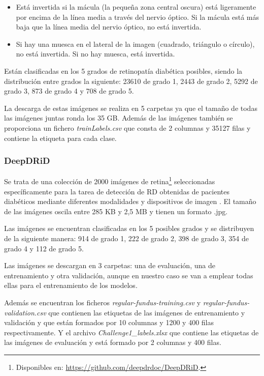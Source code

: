 \begin{itemize}
    \item Está invertida si la mácula (la pequeña zona central oscura) está ligeramente por encima de la línea media a través del nervio óptico. Si la mácula está más baja que la línea media del nervio óptico, no está invertida.
    \item Si hay una muesca en el lateral de la imagen (cuadrado, triángulo o círculo), no está invertida. Si no hay muesca, está invertida.
\end{itemize}

Están clasificadas en los 5 grados de retinopatía diabética posibles, siendo la distribución entre grados la siguiente: 23610 de grado 1, 2443 de grado 2, 5292 de grado 3, 873 de grado 4 y 708 de grado 5.

La descarga de estas imágenes se realiza en 5 carpetas ya que el tamaño de todas las imágenes juntas ronda los 35 GB. Además de las imágenes también se proporciona un fichero \textit{trainLabels.csv} que consta de 2 columnas y 35127 filas y contiene la etiqueta para cada clase.

\subsubsection{DeepDRiD}

Se trata de una colección de 2000 imágenes de retina\footnote{Disponibles en: \url{https://github.com/deepdrdoc/DeepDRiD}.} seleccionadas específicamente para la tarea de detección de RD obtenidas de pacientes diabéticos mediante diferentes modalidades y dispositivos de imagen \cite{datos:deepid}. El tamaño de las imágenes oscila entre 285 KB y 2,5 MB y tienen un formato .jpg.

Las imágenes se encuentran clasificadas en los 5 posibles grados y se distribuyen de la siguiente manera: 914 de grado 1, 222 de grado 2, 398 de grado 3, 354 de grado 4 y 112 de grado 5.

Las imágenes se descargan en 3 carpetas: una de evaluación, una de entrenamiento y otra validación, aunque en nuestro caso se van a emplear todas ellas para el entrenamiento de los modelos.

Además se encuentran los ficheros \textit{regular-fundus-training.csv} y \textit{regular-fundus-validation.csv} que contienen las etiquetas de las imágenes de entrenamiento y validación y que están formados por 10 columnas y 1200 y 400 filas respectivamente. Y el archivo \textit{Challenge1\_labels.xlsx} que contiene las etiquetas de las imágenes de evaluación y está formado por 2 columnas y 400 filas.

